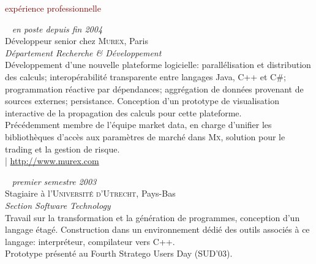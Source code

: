 \documentclass[a4paper, 10pt]{article}
\newcommand{\mysection}[1]{\fontspec{Hoefler Text}\fontsize{24pt}{0pt}\selectfont #1}%
\newcommand{\myurl}[1]{\fontspec{Gill Sans}\fontsize{10pt}{0pt}\selectfont #1}%
\begin{document}
  \begin{minipage}[t]{0.59\linewidth}
    {\textcolor{maroon}{\mysection exp\'erience professionnelle}}\\

    \par ~ \hfill \textcolor{medg}{\textit{en poste depuis fin 2004}}\\[5pt]
    {\large D\'eveloppeur senior chez \textsc{Murex}, Paris\\
    \emph{\textcolor{darkg}{D\'epartement Recherche \& D\'eveloppement}}}\\[5pt]
    D\'eveloppement d'une nouvelle plateforme logicielle: parall\'elisation et distribution des calculs; interop\'erabilit\'e transparente entre langages Java, C++ et C\#; programmation r\'eactive par d\'ependances; aggr\'egation de donn\'ees provenant de sources externes; persistance. Conception d'un prototype de visualisation interactive de la propagation des calculs pour cette plateforme.\\[5pt]
    Pr\'ec\'edemment membre de l'\'equipe market data, en charge d'unifier les biblioth\`eques d'acc\`es aux param\`etres de march\'e dans \textsc{Mx}, solution pour le trading et la gestion de risque.\\[5pt]
    {\textcolor{hyperlink}{\myurl | \url{http://www.murex.com}}}\\

    \par ~ \hfill \textcolor{medg}{\textit{premier semestre 2003}}\\[5pt]
    {\large Stagiaire \`a l'\textsc{Universit\'e d'Utrecht}, Pays-Bas\\
    \emph{\textcolor{darkg}{Section Software Technology}}}\\[5pt]
    Travail sur la transformation et la g\'en\'eration de programmes, conception d'un langage \'etag\'e. Construction dans un environnement d\'edi\'e des outils associ\'es \`a ce langage: interpr\'eteur, compilateur vers C++.\\[5pt]
    Prototype pr\'esent\'e au Fourth Stratego Users Day (SUD'03).\\


\end{minipage}
\end{document}
